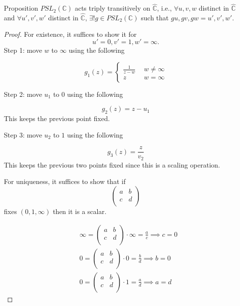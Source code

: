 \documentclass{article}
\begin{document}
\begin{misc}{Proposition}{}
\( PSL_2(\mathbb{C} ) \) acts triply transitively on \( \hat{\mathbb{C}}  \), i.e., \( \forall u,v,w  \) distinct in \( \hat{\mathbb{C}}  \) and \( \forall u',v',w' \)  distinct in \( \hat{\mathbb{C}}  \), \( \exists ! g \in PSL_2(\mathbb{C} ) \) such that \( gu,gv,gw = u',v',w'. \) 
\tcbline
\begin{proof}
For existence, it suffices to show it for 
\[
    u' = 0, v' = 1, w' = \infty. 
\]
Step 1: move \( w \) to \( \infty  \) using the following

\[
    g_1(z) = \begin{cases}
        \frac{1}{z - w} \ \ &w\neq \infty \\ 
         z \ \ &w = \infty    
    \end{cases}
\]

Step 2: move \( u_1 \) to \( 0  \) using the following

\[
    g_2(z) = z - u_1
\]
This keeps the previous point fixed. 


Step 3: move \( u_2 \) to \( 1  \) using the following

\[
    g_3(z) = \frac{z}{v_2}
\]
This keeps the previous two points fixed since this is a scaling operation.

For uniqueness, it suffices to show that if
\[
    \begin{pmatrix}
        a &  b \\
        c &  d \\
    \end{pmatrix}
\]
fixes \( (0,1, \infty ) \) then it is a scalar. 

\begin{align*}
    &\infty = \begin{pmatrix}
        a &  b \\
        c &  d \\
    \end{pmatrix} \cdot  \infty = \frac{a}{c} \implies c = 0\\
    & 0 = \begin{pmatrix}
        a &  b \\
        c &  d \\
    \end{pmatrix} \cdot 0 = \frac{b}{d} \implies b = 0\\
    & 0 = \begin{pmatrix}
        a &  b \\
        c &  d \\
    \end{pmatrix} \cdot 1 = \frac{a}{d} \implies a = d
\end{align*}


\end{proof}

\end{misc}
\end{document}
